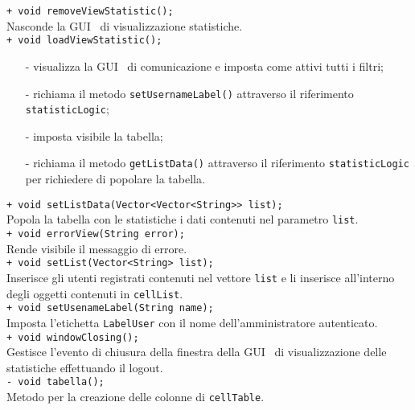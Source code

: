 {\begin{sloppypar}
{{{\begin{itemize}
					\texttt{+ void removeViewStatistic();}\\
					Nasconde la GUI\g~ di visualizzazione statistiche.\\
					
					\texttt{+ void loadViewStatistic();}
					\begin{itemize}
						\item[-] visualizza la GUI\g~ di comunicazione e imposta come attivi tutti i filtri;
						\item[-] richiama il metodo \texttt{setUsernameLabel()} attraverso il riferimento \texttt{statisticLogic};
						\item[-] imposta visibile la tabella;
						\item[-] richiama il metodo \texttt{getListData()} attraverso il riferimento \texttt{statisticLogic} per richiedere di popolare la tabella.\\
					\end{itemize}
					
					\texttt{+ void setListData(Vector<Vector<String>> list);}\\
					Popola la tabella con le statistiche i dati contenuti nel parametro \texttt{list}.\\
					
					\texttt{+ void errorView(String error);}\\
					Rende visibile il messaggio di errore.\\
					
					\texttt{+ void setList(Vector<String> list);}\\
					Inserisce gli utenti registrati contenuti nel vettore \texttt{list} e li inserisce all'interno degli oggetti contenuti in \texttt{cellList}.\\
					
					\texttt{+ void setUsenameLabel(String name);}\\
					Imposta l'etichetta \texttt{LabelUser} con il nome dell'amministratore autenticato.\\
					
					\texttt{+ void windowClosing();}\\
					Gestisce l'evento di chiusura della finestra della GUI\g~ di visualizzazione delle statistiche effettuando il logout.\\
					
					\texttt{- void tabella();}\\
					Metodo per la creazione delle colonne di \texttt{cellTable}.\\
					

\end{itemize}}}}
\end{sloppypar}}
